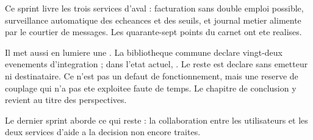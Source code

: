 Ce sprint livre les trois services d'aval : facturation sans double
emploi possible, surveillance automatique des echeances et des seuils, et
journal metier alimente par le courtier de messages. Les quarante-sept
points du carnet ont ete realises.

Il met aussi en lumiere une .
La bibliotheque commune declare vingt-deux evenements d'integration ;
dans l'etat actuel, . Le reste est declare sans emetteur ni destinataire. Ce n'est
pas un defaut de fonctionnement, mais une reserve de couplage qui n'a pas
ete exploitee faute de temps. Le chapitre de conclusion y revient au titre
des perspectives.

Le dernier sprint aborde ce qui reste : la collaboration entre les
utilisateurs et les deux services d'aide a la decision non encore
traites.
